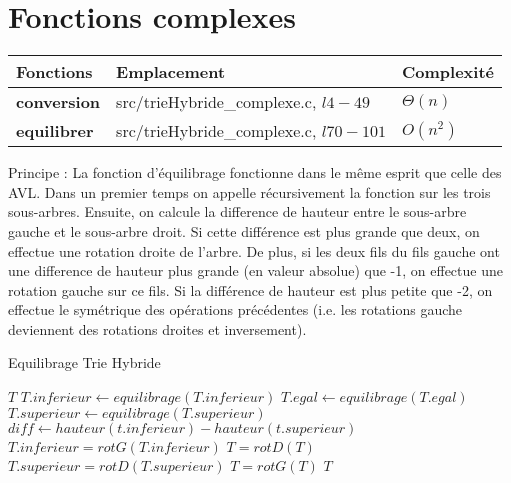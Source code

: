 \documentclass[11pt]{report} %
\begin{document}
\section{Fonctions complexes}

\begin{center}
  \begin{tabular}{|l|l|l|}
    \hline  \textbf{Fonctions} & \textbf{Emplacement} & \textbf{Complexité}\\  \hline
    \textbf{conversion} & src/trieHybride\_complexe.c, $l4-49$  & $\Theta(n)$ \\ \hline
    \textbf{equilibrer} & src/trieHybride\_complexe.c, $l70-101$  & $O(n^2)$ \\ \hline
  \end{tabular}
\end{center}

Principe : La fonction d'équilibrage fonctionne dans le même esprit que celle des AVL. Dans un premier temps on appelle récursivement la fonction sur les trois sous-arbres. Ensuite, on calcule la difference de hauteur entre le sous-arbre gauche et le sous-arbre droit. Si cette différence est plus grande que deux, on effectue une rotation droite de l'arbre. De plus, si les deux fils du fils gauche ont une difference de hauteur plus grande (en valeur absolue) que -1, on effectue une rotation gauche sur ce fils. Si la différence de hauteur est plus petite que -2, on effectue le symétrique des opérations précédentes (i.e. les rotations gauche deviennent des rotations droites et inversement).
\begin{algorithm}
  \caption{Equilibrage Trie Hybride}
  \begin{algorithmic}[1]
     $T$
    \EndIf
    \State $T.inferieur \gets equilibrage(T.inferieur)$
    \State $T.egal \gets equilibrage(T.egal)$
    \State $T.superieur \gets equilibrage(T.superieur)$
    \State $diff \gets hauteur(t.inferieur)-hauteur(t.superieur)$
    \State $T.inferieur=rotG(T.inferieur)$
    \EndIf  
    \State $T=rotD(T)$
    \State $T.superieur=rotD(T.superieur)$
    \EndIf  
    \State $T=rotG(T)$
    \EndIf
     $T$
    \EndFunction
  \end{algorithmic}
\end{algorithm}
\end{document}
